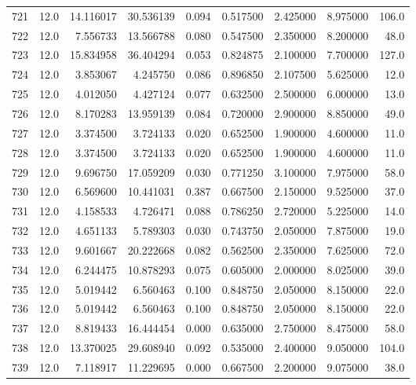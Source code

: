 \begin{tabular}{lrrrrrrrr}
721  &   12.0 &  14.116017 &  30.536139 &  0.094 &  0.517500 &  2.425000 &   8.975000 &  106.0 \\
722  &   12.0 &   7.556733 &  13.566788 &  0.080 &  0.547500 &  2.350000 &   8.200000 &   48.0 \\
723  &   12.0 &  15.834958 &  36.404294 &  0.053 &  0.824875 &  2.100000 &   7.700000 &  127.0 \\
724  &   12.0 &   3.853067 &   4.245750 &  0.086 &  0.896850 &  2.107500 &   5.625000 &   12.0 \\
725  &   12.0 &   4.012050 &   4.427124 &  0.077 &  0.632500 &  2.500000 &   6.000000 &   13.0 \\
726  &   12.0 &   8.170283 &  13.959139 &  0.084 &  0.720000 &  2.900000 &   8.850000 &   49.0 \\
727  &   12.0 &   3.374500 &   3.724133 &  0.020 &  0.652500 &  1.900000 &   4.600000 &   11.0 \\
728  &   12.0 &   3.374500 &   3.724133 &  0.020 &  0.652500 &  1.900000 &   4.600000 &   11.0 \\
729  &   12.0 &   9.696750 &  17.059209 &  0.030 &  0.771250 &  3.100000 &   7.975000 &   58.0 \\
730  &   12.0 &   6.569600 &  10.441031 &  0.387 &  0.667500 &  2.150000 &   9.525000 &   37.0 \\
731  &   12.0 &   4.158533 &   4.726471 &  0.088 &  0.786250 &  2.720000 &   5.225000 &   14.0 \\
732  &   12.0 &   4.651133 &   5.789303 &  0.030 &  0.743750 &  2.050000 &   7.875000 &   19.0 \\
733  &   12.0 &   9.601667 &  20.222668 &  0.082 &  0.562500 &  2.350000 &   7.625000 &   72.0 \\
734  &   12.0 &   6.244475 &  10.878293 &  0.075 &  0.605000 &  2.000000 &   8.025000 &   39.0 \\
735  &   12.0 &   5.019442 &   6.560463 &  0.100 &  0.848750 &  2.050000 &   8.150000 &   22.0 \\
736  &   12.0 &   5.019442 &   6.560463 &  0.100 &  0.848750 &  2.050000 &   8.150000 &   22.0 \\
737  &   12.0 &   8.819433 &  16.444454 &  0.000 &  0.635000 &  2.750000 &   8.475000 &   58.0 \\
738  &   12.0 &  13.370025 &  29.608940 &  0.092 &  0.535000 &  2.400000 &   9.050000 &  104.0 \\
739  &   12.0 &   7.118917 &  11.229695 &  0.000 &  0.667500 &  2.200000 &   9.075000 &   38.0 \\

\end{tabular}
